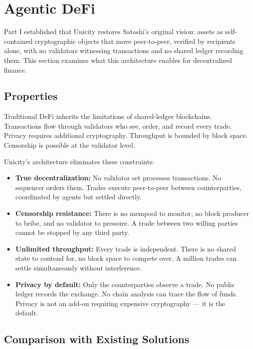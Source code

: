 \documentclass{article}
\begin{document}
\section{Agentic DeFi}

Part I established that Unicity restores Satoshi's original vision: assets as self-contained cryptographic objects that move peer-to-peer, verified by recipients alone, with no validators witnessing transactions and no shared ledger recording them. This section examines what this architecture enables for decentralized finance.

\subsection{Properties}

Traditional DeFi inherits the limitations of shared-ledger blockchains. Transactions flow through validators who see, order, and record every trade. Privacy requires additional cryptography. Throughput is bounded by block space. Censorship is possible at the validator level.

Unicity's architecture eliminates these constraints:

\begin{itemize}
    \item \textbf{True decentralization:}
    No validator set processes transactions. No sequencer orders them. Trades execute peer-to-peer between counterparties, coordinated by agents but settled directly.

    \item \textbf{Censorship resistance:}
    There is no mempool to monitor, no block producer to bribe, and no validator to pressure. A trade between two willing parties cannot be stopped by any third party.

    \item \textbf{Unlimited throughput:}
    Every trade is independent. There is no shared state to contend for, no block space to compete over. A million trades can settle simultaneously without interference.

    \item \textbf{Privacy by default:}
    Only the counterparties observe a trade. No public ledger records the exchange. No chain analysis can trace the flow of funds. Privacy is not an add-on requiring expensive cryptography --- it is the default.
\end{itemize}

\subsection{Comparison with Existing Solutions}
\end{document}
